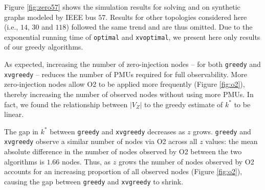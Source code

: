 {Figure \ref{fig:zero57} shows the simulation results for solving \full and \xval on synthetic graphs modeled by IEEE bus $57$. Results for other topologies considered here 
(i.e., $14$, $30$ and $118$) followed the same trend and are thus omitted. Due to the exponential running time of {\tt optimal} and {\tt xvoptimal}, we present here only results of our 
greedy algorithms. 

As expected, increasing the number of zero-injection nodes -- for both {\tt greedy} and {\tt xvgreedy} -- reduces the number of PMUs required for 
full observability. 
More zero-injection nodes allow O2 to be applied more frequently (Figure \ref{fig:o2}), thereby increasing the number of observed nodes without using more PMUs.
In fact, we found the relationship between $|V_Z|$ to the greedy estimate of $k^*$  to be linear.

The gap in $k^*$ between {\tt greedy} and {\tt xvgreedy} decreases as $z$ grows. {\tt greedy} and {\tt xvgreedy} observe a similar
number of nodes via O2 across all $z$ values: the mean absolute difference in the number of nodes observed by O2 between the two algorithms is $1.66$ nodes.  
Thus, as $z$ grows the number of nodes observed by O2 accounts for an increasing proportion of all observed nodes (Figure \ref{fig:o2}), causing the gap between {\tt greedy} and {\tt xvgreedy} to shrink.



}
